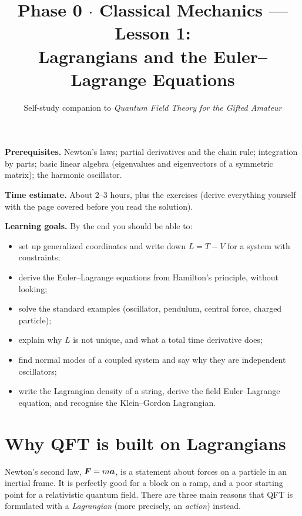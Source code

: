 \documentclass[11pt]{article}
\title{Phase 0 $\cdot$ Classical Mechanics --- Lesson 1:\\ Lagrangians and the Euler--Lagrange Equations}
\author{Self-study companion to \emph{Quantum Field Theory for the Gifted Amateur}}
\date{}
\begin{document}
\maketitle

\begin{tcolorbox}[colback=gray!6,colframe=gray!50!black,title={Lesson at a glance},breakable]
\textbf{Prerequisites.} Newton's laws; partial derivatives and the chain rule; integration by parts; basic linear algebra (eigenvalues and eigenvectors of a symmetric matrix); the harmonic oscillator.

\textbf{Time estimate.} About 2--3 hours, plus the exercises (derive everything yourself with the page covered before you read the solution).

\textbf{Learning goals.} By the end you should be able to:
\begin{itemize}[nosep]
  \item set up generalized coordinates and write down $L=T-V$ for a system with constraints;
  \item derive the Euler--Lagrange equations from Hamilton's principle, without looking;
  \item solve the standard examples (oscillator, pendulum, central force, charged particle);
  \item explain why $L$ is not unique, and what a total time derivative does;
  \item find normal modes of a coupled system and say why they are independent oscillators;
  \item write the Lagrangian density of a string, derive the field Euler--Lagrange equation, and recognise the Klein--Gordon Lagrangian.
\end{itemize}
\end{tcolorbox}

\tableofcontents

\section{Why QFT is built on Lagrangians}

Newton's second law, $\bm{F} = m\bm{a}$, is a statement about forces on a particle in an inertial frame. It is perfectly good for a block on a ramp, and a poor starting point for a relativistic quantum field. There are three main reasons that QFT is formulated with a \emph{Lagrangian} (more precisely, an \emph{action}) instead.
\end{document}
